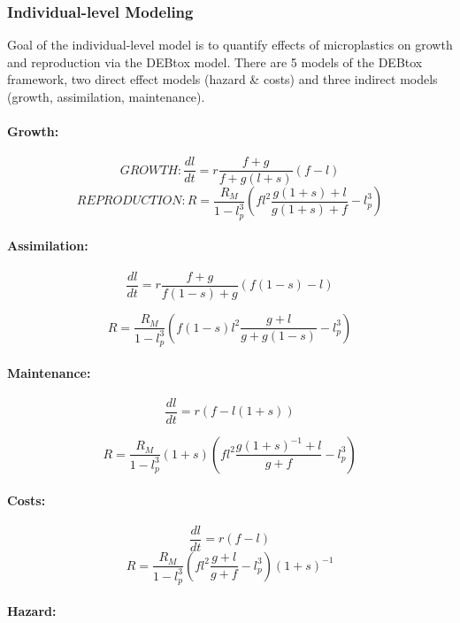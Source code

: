 \documentclass[
]{article}
\begin{document}
\hypertarget{individual-level-modeling}{%
\subsubsection{Individual-level
Modeling}\label{individual-level-modeling}}

Goal of the individual-level model is to quantify effects of
microplastics on growth and reproduction via the DEBtox model. There are
5 models of the DEBtox framework, two direct effect models (hazard \&
costs) and three indirect models (growth, assimilation, maintenance).

\hypertarget{growth}{%
\paragraph{Growth:}\label{growth}}

\[ GROWTH: \frac{dl}{dt} = r\frac{f+g}{f + g(l+s)}(f-l)\]
\[ REPRODUCTION: R = \frac{R_M}{1-l^3_p} \left( fl^2\frac{g(1+s) + l}{g(1+s) + f}-l^3_p\right)\]

\hypertarget{assimilation}{%
\paragraph{Assimilation:}\label{assimilation}}

\[ \frac{dl}{dt} = r\frac{f+g}{f(1-s)+g}(f(1-s)-l)\]

\[ R = \frac{R_M}{1-l^3_p}\left(f(1-s)l^2\frac{g+ l}{g+g(1-s)}-l^3_p\right)\]

\hypertarget{maintenance}{%
\paragraph{Maintenance:}\label{maintenance}}

\[ \frac{dl}{dt} = r(f-l(1+s))\]

\[ R = \frac{R_M}{1-l^3_p}(1+s)\left(fl^2\frac{g(1+s)^{-1} + l}{g+ f}-l^3_p\right)\]

\hypertarget{costs}{%
\paragraph{Costs:}\label{costs}}

\[ \frac{dl}{dt} = r(f-l)\]
\[ R = \frac{R_M}{1-l^3_p}\left(fl^2\frac{g + l}{g + f}-l^3_p\right)(1+s)^{-1}\]

\hypertarget{hazard}{%
\paragraph{Hazard:}\label{hazard}}
\end{document}
